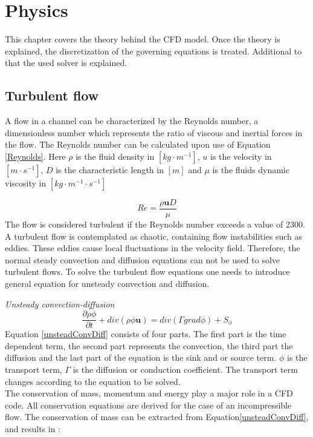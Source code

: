\documentclass{CFD2017}
\begin{document}
\section{Physics}
This chapter covers the theory behind the CFD model. Once the theory is explained, the discretization of the governing equations is treated. Additional to that the used solver is explained.

\subsection{Turbulent flow}
A flow in a channel can be characterized by the Reynolds number, a dimensionless number which represents the ratio of viscous and inertial forces in the flow. The Reynolds number can be calculated upon use of Equation \ref{Reynolds}\cite{Versteeg2007}. Here $\rho$ is the fluid density in $[kg\cdot m^{-1}]$, $u$ is the velocity in $[m\cdot s^{-1}]$, $D$ is the characteristic length in $[m]$ and $\mu$ is the fluids dynamic viscosity in $[kg\cdot m^{-1}\cdot s^{-1}]$

\begin{equation}
\label{Reynolds}
Re = \frac{\rho \boldsymbol{u} D}{\mu}
\end{equation}
The flow is considered turbulent if the Reynolds number exceeds a value of 2300. A turbulent flow is contemplated as chaotic, containing flow instabilities such as eddies. These eddies cause local fluctuations in the velocity field. Therefore, the normal steady convection and diffusion equations can not be used to solve turbulent flows. To solve the turbulent flow equations one needs to introduce general equation for unsteady convection and diffusion\cite{Versteeg2007}.\vspace{2mm}

\emph{Unsteady convection-diffusion}
\begin{equation}
\label{unsteadConvDiff}
\frac{\partial \rho \phi}{\partial t} + div(\rho\phi\mathbf u)= div(\Gamma grad \phi)+S_{\phi}
\end{equation}
Equation \ref{unsteadConvDiff} consists of four parts. The first part is the time dependent term, the second part represents the convection, the third part the diffusion and the last part of the equation is the sink and or source term. $\phi$ is the transport term, $\Gamma$ is the diffusion or conduction coefficient. The transport term changes according to the equation to be solved. \\
The conservation of mass, momentum and energy play a major role in a CFD code. All conservation equations are derived for the case of an incompressible flow. The conservation of mass can be extracted from Equation\ref{unsteadConvDiff}, and results in \cite{slides}:\vspace{2mm}
\end{document}
